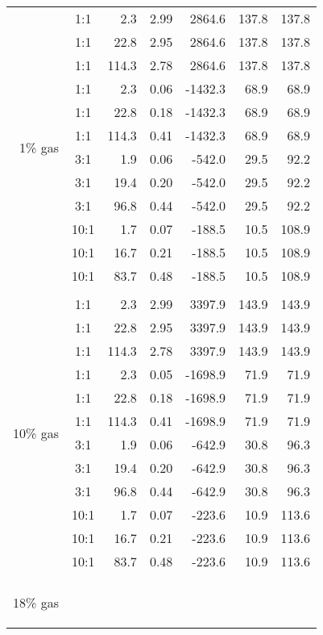 \documentclass{article}
\begin{document}
\begin{center}
\begin{longtable}{rcrrrrr}
\multirow{12}{*}{\begin{sideways}{\Large{1\% gas}} \end{sideways}}
& 1:1  & 2.3   & 2.99 & 2864.6  & 137.8 &  137.8 \\
& 1:1  & 22.8  & 2.95 & 2864.6  & 137.8 &  137.8 \\
& 1:1  & 114.3 & 2.78 & 2864.6  & 137.8 &  137.8 \\
& 1:1  & 2.3   & 0.06 & -1432.3 & 68.9  &  68.9 \\
& 1:1  & 22.8  & 0.18 & -1432.3 & 68.9  &  68.9\\
& 1:1  & 114.3 & 0.41 & -1432.3 & 68.9  & 68.9 \\
& 3:1  & 1.9   & 0.06 & -542.0  & 29.5  & 92.2\\
& 3:1  & 19.4  & 0.20 & -542.0  & 29.5  & 92.2\\
& 3:1  & 96.8  & 0.44 & -542.0  & 29.5  & 92.2\\
& 10:1 & 1.7   & 0.07 & -188.5  & 10.5  & 108.9\\
& 10:1 & 16.7  & 0.21 & -188.5  & 10.5  & 108.9\\
& 10:1 & 83.7  & 0.48 & -188.5  & 10.5  & 108.9\\[0.1ex]\hline\\[0.1ex]
\multirow{12}{*}{\begin{sideways}{\Large{10\% gas}} \end{sideways}}
& 1:1   & 2.3   & 2.99 & 3397.9  & 143.9 & 143.9\\
& 1:1   & 22.8  & 2.95 & 3397.9  & 143.9 & 143.9\\
& 1:1   & 114.3 & 2.78 & 3397.9  & 143.9 & 143.9\\
& 1:1   & 2.3   & 0.05 & -1698.9 & 71.9  & 71.9 \\
& 1:1   & 22.8  & 0.18 & -1698.9 & 71.9  & 71.9 \\
& 1:1   & 114.3 & 0.41 & -1698.9 & 71.9  & 71.9 \\
& 3:1   & 1.9   & 0.06 & -642.9  & 30.8  & 96.3\\
& 3:1   & 19.4  & 0.20 & -642.9  & 30.8  & 96.3\\
& 3:1   & 96.8  & 0.44 & -642.9  & 30.8  & 96.3\\
& 10:1  & 1.7   & 0.07 & -223.6  & 10.9  & 113.6\\
& 10:1  & 16.7  & 0.21 & -223.6  & 10.9  & 113.6\\
& 10:1  & 83.7  & 0.48 & -223.6  & 10.9  & 113.6\\[0.1ex]\hline\\[0.1ex]
\multirow{12}{*}{\begin{sideways}{\Large{18\% gas}} \end{sideways}}

\end{longtable}
\end{center}
\end{document}
